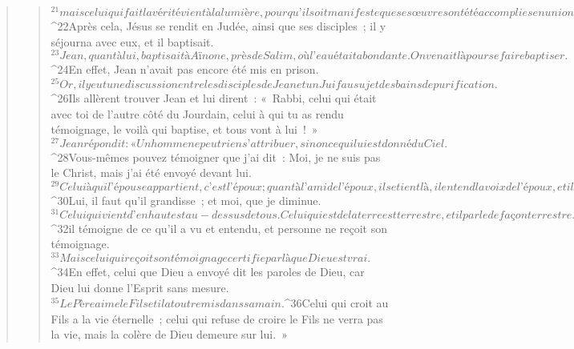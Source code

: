 \begin{verse}
\begin{verse}
${}^{21}mais celui qui fait la vérité vient à la lumière, pour qu’il soit manifeste que ses œuvres ont été accomplies en union avec Dieu. »
${}^{22}Après cela, Jésus se rendit en Judée, ainsi que ses disciples ; il y séjourna avec eux, et il baptisait. 
${}^{23}Jean, quant à lui, baptisait à Aïnone, près de Salim, où l’eau était abondante. On venait là pour se faire baptiser. 
${}^{24}En effet, Jean n’avait pas encore été mis en prison.
${}^{25}Or, il y eut une discussion entre les disciples de Jean et un Juif au sujet des bains de purification. 
${}^{26}Ils allèrent trouver Jean et lui dirent : « Rabbi, celui qui était avec toi de l’autre côté du Jourdain, celui à qui tu as rendu témoignage, le voilà qui baptise, et tous vont à lui ! » 
${}^{27}Jean répondit : « Un homme ne peut rien s’attribuer, sinon ce qui lui est donné du Ciel. 
${}^{28}Vous-mêmes pouvez témoigner que j’ai dit : Moi, je ne suis pas le Christ, mais j’ai été envoyé devant lui. 
${}^{29}Celui à qui l’épouse appartient, c’est l’époux ; quant à l’ami de l’époux, il se tient là, il entend la voix de l’époux, et il en est tout joyeux. Telle est ma joie : elle est parfaite. 
${}^{30}Lui, il faut qu’il grandisse ; et moi, que je diminue.
${}^{31}Celui qui vient d’en haut est au-dessus de tous. Celui qui est de la terre est terrestre, et il parle de façon terrestre. Celui qui vient du ciel est au-dessus de tous, 
${}^{32}il témoigne de ce qu’il a vu et entendu, et personne ne reçoit son témoignage. 
${}^{33}Mais celui qui reçoit son témoignage certifie par là que Dieu est vrai. 
${}^{34}En effet, celui que Dieu a envoyé dit les paroles de Dieu, car Dieu lui donne l’Esprit sans mesure. 
${}^{35}Le Père aime le Fils et il a tout remis dans sa main. 
${}^{36}Celui qui croit au Fils a la vie éternelle ; celui qui refuse de croire le Fils ne verra pas la vie, mais la colère de Dieu demeure sur lui. »
      

\end{verse}
\end{verse}
